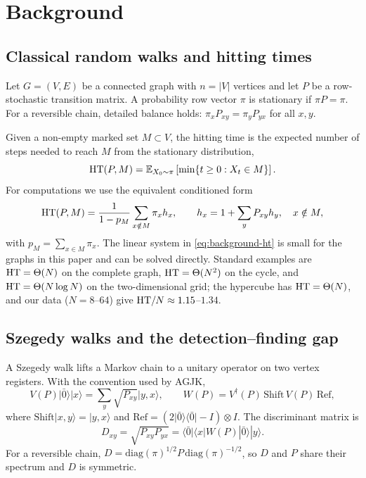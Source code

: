 \section{Background}
\label{sec:background}

\subsection{Classical random walks and hitting times}
\label{sec:background-classical}

Let $G=(V,E)$ be a connected graph with $n=\lvert V\rvert$ vertices and let
$P$ be a row-stochastic transition matrix. A probability row vector $\pi$ is
stationary if $\pi P=\pi$. For a reversible chain, detailed balance holds:
$\pi_xP_{xy}=\pi_yP_{yx}$ for all $x,y$.

Given a non-empty marked set $M\subset V$, the hitting time is the expected
number of steps needed to reach $M$ from the stationary distribution,
\begin{equation}
  \mathrm{HT}(P,M)=\mathbb{E}_{X_0\sim\pi}\left[\min\{t\ge0:X_t\in M\}\right].
\end{equation}
For computations we use the equivalent conditioned form
\begin{equation}
  \mathrm{HT}(P,M)=\frac{1}{1-p_M}\sum_{x\notin M}\pi_x h_x,
  \qquad h_x=1+\sum_yP_{xy}h_y,\quad x\notin M,
  \label{eq:background-ht}
\end{equation}
with $p_M=\sum_{x\in M}\pi_x$. The linear system in \eqref{eq:background-ht}
is small for the graphs in this paper and can be solved directly. Standard
examples are $\mathrm{HT}=\Theta(N)$ on the complete graph, $\mathrm{HT}=\Theta(N^2)$ on the
cycle, and $\mathrm{HT}=\Theta(N\log N)$ on the two-dimensional grid; the hypercube has
$\mathrm{HT}=\Theta(N)$, and our data ($N=8$--$64$) give $\mathrm{HT}/N\approx1.15$--$1.34$.

\subsection{Szegedy walks and the detection--finding gap}
\label{sec:background-szegedy}

A Szegedy walk lifts a Markov chain to a unitary operator on two vertex
registers. With the convention used by AGJK,
\begin{equation}
  V(P)\lvert\bar0\rangle\lvert x\rangle
  =\sum_y\sqrt{P_{xy}}\lvert y,x\rangle,
  \qquad
  W(P)=V^\dagger(P)\,\mathrm{Shift}\,V(P)\,\mathrm{Ref},
  \label{eq:background-szegedy}
\end{equation}
where $\mathrm{Shift}\lvert x,y\rangle=\lvert y,x\rangle$ and
$\mathrm{Ref}=(2\lvert\bar0\rangle\langle\bar0\rvert-I)\otimes I$. The
discriminant matrix is
\begin{equation}
  D_{xy}=\sqrt{P_{xy}P_{yx}}
  =\langle\bar0|\langle x|W(P)|\bar0\rangle|y\rangle.
\end{equation}
For a reversible chain, $D=\mathrm{diag}(\pi)^{1/2}P\,\mathrm{diag}(\pi)^{-1/2}$,
so $D$ and $P$ share their spectrum and $D$ is symmetric.

